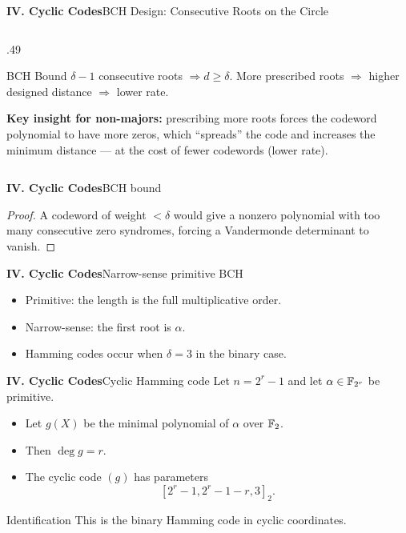 \begin{frame}{\textbf{IV. Cyclic Codes}}{BCH Design: Consecutive Roots on the Circle}
\begin{columns}[T,onlytextwidth]
\begin{column}{.49\textwidth}
    \medskip
    \begin{block}{BCH Bound}
    $\delta-1$ consecutive roots $\Rightarrow d \ge \delta$. More prescribed roots $\Rightarrow$ higher designed distance $\Rightarrow$ lower rate.
    \end{block}

    \medskip
    \textcolor{TealDarkCyan}{\textbf{Key insight for non-majors:}} prescribing more roots forces the codeword polynomial to have more zeros, which ``spreads'' the code and increases the minimum distance — at the cost of fewer codewords (lower rate).
  \end{column}
\end{columns}
\end{frame}

\begin{frame}{\textbf{IV. Cyclic Codes}}{BCH bound}
\small
{}
\begin{proof}
A codeword of weight $<\delta$ would give a nonzero polynomial with too many consecutive zero syndromes, forcing a Vandermonde determinant to vanish.
\end{proof}
\end{frame}

\begin{frame}{\textbf{IV. Cyclic Codes}}{Narrow-sense primitive BCH}
\small
{}
\begin{itemize}
  \item Primitive: the length is the full multiplicative order.
  \item Narrow-sense: the first root is $\alpha$.
  \item Hamming codes occur when $\delta=3$ in the binary case.
\end{itemize}
\end{frame}

\begin{frame}{\textbf{IV. Cyclic Codes}}{Cyclic Hamming code}
\small
Let $n=2^r-1$ and let $\alpha\in\mathbb{F}_{2^r}$ be primitive.
\begin{itemize}
  \item Let $g(X)$ be the minimal polynomial of $\alpha$ over $\mathbb{F}_2$.
  \item Then $\deg g=r$.
  \item The cyclic code $(g)$ has parameters
  \[
    [2^r-1,2^r-1-r,3]_2.
  \]
\end{itemize}
\begin{block}{Identification}
This is the binary Hamming code in cyclic coordinates.
\end{block}
\end{frame}


